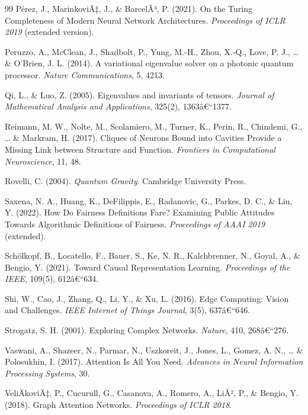 ﻿\documentclass[12pt,a4paper,twoside]{article}
\theoremstyle{definition}
\theoremstyle{plain}
\theoremstyle{remark}
\begin{document}
\begin{thebibliography}{99}
  Pérez, J., MarinkoviÄ‡, J., \& BarcelÃ³, P. (2021).
  On the Turing Completeness of Modern Neural Network Architectures.
  \textit{Proceedings of ICLR 2019} (extended version).

  Peruzzo, A., McClean, J., Shadbolt, P., Yung, M.-H., Zhou, X.-Q.,
  Love, P. J., \ldots{} \& O'Brien, J. L. (2014).
  A variational eigenvalue solver on a photonic quantum processor.
  \textit{Nature Communications}, 5, 4213.

  Qi, L., \& Luo, Z. (2005).
  Eigenvalues and invariants of tensors.
  \textit{Journal of Mathematical Analysis and Applications}, 325(2), 1363â€“1377.

  Reimann, M. W., Nolte, M., Scolamiero, M., Turner, K., Perin, R.,
  Chindemi, G., \ldots{} \& Markram, H. (2017).
  Cliques of Neurons Bound into Cavities Provide a Missing Link
  between Structure and Function.
  \textit{Frontiers in Computational Neuroscience}, 11, 48.

  Rovelli, C. (2004).
  \textit{Quantum Gravity}.
  Cambridge University Press.

  Saxena, N. A., Huang, K., DeFilippis, E., Radanovic, G.,
  Parkes, D. C., \& Liu, Y. (2022).
  How Do Fairness Definitions Fare? Examining Public Attitudes
  Towards Algorithmic Definitions of Fairness.
  \textit{Proceedings of AAAI 2019} (extended).

  Schölkopf, B., Locatello, F., Bauer, S., Ke, N. R., Kalchbrenner, N.,
  Goyal, A., \& Bengio, Y. (2021).
  Toward Causal Representation Learning.
  \textit{Proceedings of the IEEE}, 109(5), 612â€“634.

  Shi, W., Cao, J., Zhang, Q., Li, Y., \& Xu, L. (2016).
  Edge Computing: Vision and Challenges.
  \textit{IEEE Internet of Things Journal}, 3(5), 637â€“646.

  Strogatz, S. H. (2001).
  Exploring Complex Networks.
  \textit{Nature}, 410, 268â€“276.

  Vaswani, A., Shazeer, N., Parmar, N., Uszkoreit, J., Jones, L.,
  Gomez, A. N., \ldots{} \& Polosukhin, I. (2017).
  Attention Is All You Need.
  \textit{Advances in Neural Information Processing Systems}, 30.

  VeliÄkoviÄ‡, P., Cucurull, G., Casanova, A., Romero, A.,
  LiÃ², P., \& Bengio, Y. (2018).
  Graph Attention Networks.
  \textit{Proceedings of ICLR 2018}.


\end{thebibliography}
\end{document}
